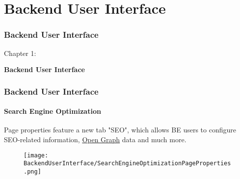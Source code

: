%

\section{Backend User Interface}
\begin{frame}[fragile]
	\frametitle{Backend User Interface}

	\begin{center}\huge{Chapter 1:}\end{center}
	\begin{center}\huge{\color{typo3darkgrey}\textbf{Backend User Interface}}\end{center}

\end{frame}


\begin{frame}[fragile]
	\frametitle{Backend User Interface}
	\framesubtitle{Search Engine Optimization}

	Page properties feature a new tab "SEO", which allows BE users to configure
	SEO-related information, \href{http://ogp.me/}{Open Graph} data and much more.

	\begin{figure}
		\texttt{[image: BackendUserInterface/SearchEngineOptimizationPageProperties.png]}
	\end{figure}

\end{frame}


